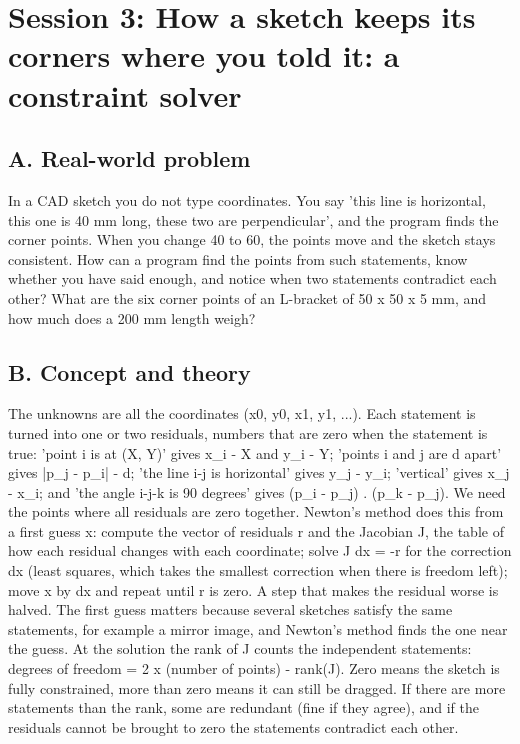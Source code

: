 \documentclass[11pt,a4paper]{article}
\begin{document}
\section{Session 3: How a sketch keeps its corners where you told it: a constraint solver}

\subsection*{A. Real-world problem}
In a CAD sketch you do not type coordinates. You say 'this line is horizontal, this one is 40 mm long, these two are perpendicular', and the program finds the corner points. When you change 40 to 60, the points move and the sketch stays consistent. How can a program find the points from such statements, know whether you have said enough, and notice when two statements contradict each other? What are the six corner points of an L-bracket of 50 x 50 x 5 mm, and how much does a 200 mm length weigh?

\subsection*{B. Concept and theory}
The unknowns are all the coordinates (x0, y0, x1, y1, ...). Each statement is turned into one or two residuals, numbers that are zero when the statement is true: 'point i is at (X, Y)' gives x\_i - X and y\_i - Y; 'points i and j are d apart' gives |p\_j - p\_i| - d; 'the line i-j is horizontal' gives y\_j - y\_i; 'vertical' gives x\_j - x\_i; and 'the angle i-j-k is 90 degrees' gives (p\_i - p\_j) . (p\_k - p\_j). We need the points where all residuals are zero together. Newton's method does this from a first guess x: compute the vector of residuals r and the Jacobian J, the table of how each residual changes with each coordinate; solve J dx = -r for the correction dx (least squares, which takes the smallest correction when there is freedom left); move x by dx and repeat until r is zero. A step that makes the residual worse is halved. The first guess matters because several sketches satisfy the same statements, for example a mirror image, and Newton's method finds the one near the guess. At the solution the rank of J counts the independent statements: degrees of freedom = 2 x (number of points) - rank(J). Zero means the sketch is fully constrained, more than zero means it can still be dragged. If there are more statements than the rank, some are redundant (fine if they agree), and if the residuals cannot be brought to zero the statements contradict each other.
\end{document}
